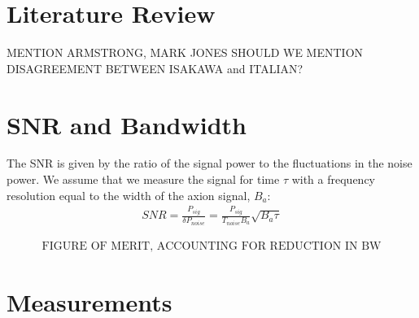 \documentclass[aps,prl,twocolumn,groupedaddress]{revtex4-1}
\begin{document}
                                
%
%
%
%
%
%
%
%
%
%

\section{Literature Review}

MENTION ARMSTRONG, MARK JONES
SHOULD WE MENTION DISAGREEMENT BETWEEN ISAKAWA and ITALIAN?

\section{SNR and Bandwidth}
The SNR is given by the ratio of the signal power to the fluctuations in the noise power. We assume that we measure the signal for time $\tau$ with a frequency resolution equal to the width of the axion signal, $B_a$:
\begin{align}
SNR = \frac{P_{sig}}{\delta P_{noise}} = \frac{P_{sig}}{T_{noise}B_a}\sqrt{B_a \tau}
\end{align}

\begin{align}
\text{FIGURE OF MERIT, ACCOUNTING FOR REDUCTION IN BW}
\end{align}

\section{Measurements}
\end{document}
